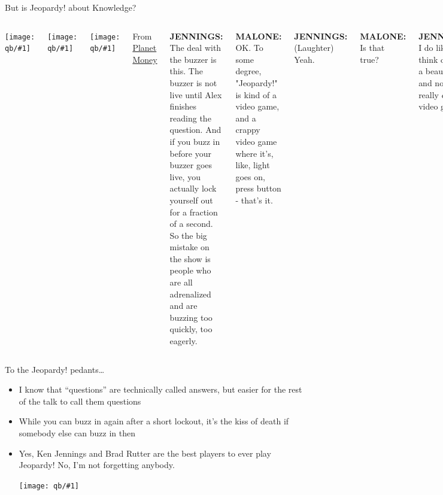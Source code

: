 \documentclass[xcolor=dvipsnames,xcolor=table]{beamer}
\newcommand{\gfxq}[2]{
\begin{center}
	\texttt{[image: qb/\#1]}
\end{center}
}
\begin{document}
\begin{frame}{But is Jeopardy! about Knowledge?}

  \begin{columns}
    \gfxq{planet_money}{.75}
    \gfxq{jennings}{.7}  
    \gfxq{kenny_malone}{.7}

    From \href{file:///Users/jbg/repositories/jbg-talks/qb/jennings-buzzer.mp3}{Planet Money} \\
    
    \small

    {\bf JENNINGS:} The deal with the buzzer is this. The buzzer is
    not live until Alex finishes reading the question. And if you buzz
    in before your buzzer goes live, \alert<1>{you actually lock yourself out
    for a fraction of a second}. So the big mistake on the show is
    people who are all adrenalized and are buzzing too quickly, too
    eagerly.

    \pause

    {\bf MALONE:} OK. To some degree, "Jeopardy!" is kind of a video game, and a \alert<2>{crappy video game where it's, like, light goes on, press button} - that's it.

    \pause
    
    {\bf JENNINGS:} (Laughter) Yeah.

    {\bf MALONE:} Is that true?

    {\bf JENNINGS:} I do like to think of it as a \alert<3>{beautiful art} and not a really crappy video game.
    
  \end{columns}
  
\end{frame}

\begin{frame}{To the Jeopardy! pedants\dots}

  \begin{itemize}
  \item I know that ``questions'' are technically called answers, but
    easier for the rest of the talk to call them questions
  \item While you can buzz in again after a short lockout, it's the
    kiss of death if somebody else can buzz in then
  \item Yes, Ken Jennings and Brad Rutter are the best players to ever play Jeopardy!
    No, I'm not forgetting anybody.

    \gfxq{holzhauer}{.5}
    
  \end{itemize}

\end{frame}
\end{document}
